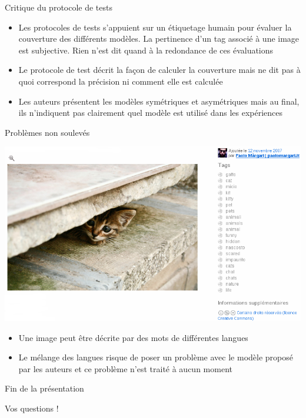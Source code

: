 \documentclass{beamer}
\begin{document}
\begin{frame}{Critique du protocole de tests}
	
	\begin{itemize}
	\item Les protocoles de tests s'appuient sur un étiquetage humain pour évaluer la couverture des différents modèles. La pertinence d'un tag associé à une image est subjective. Rien n'est dit quand à la redondance de ces évaluations
	\item Le protocole de test décrit la façon de calculer la couverture mais ne dit pas à quoi correspond la précision ni comment elle est calculée
	\item Les auteurs présentent les modèles symétriques et asymétriques mais au final, ils n'indiquent pas clairement quel modèle est utilisé dans les expériences
	\end{itemize}

\end{frame}

\begin{frame}{Problèmes non soulevés}
	
	\begin{center}
        \includegraphics[width=.70\linewidth]{images/capture.png}
	\end{center}
	\begin{itemize}
	\item Une image peut être décrite par des mots de différentes langues
	\item Le mélange des langues risque de poser un problème avec le modèle proposé par les auteurs et ce problème n'est traité à aucun moment
	\end{itemize}

\end{frame}


\appendix

\begin{frame}{Fin de la présentation}
	\begin{center}
        Vos questions !
	\end{center}
\end{frame}
\end{document}
